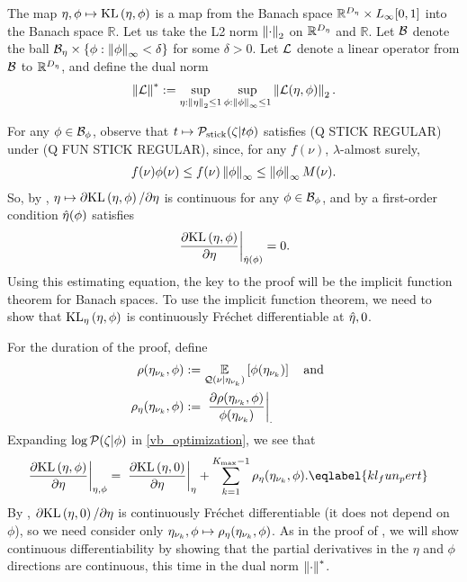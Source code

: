 %
The map $\eta, \phi \mapsto \mathrm{KL}\left(\eta, \phi\right)$ is a map from the Banach space
$\mathbb{R}^{D_{\eta}} \times {L_{\infty}[0,1]}$ into the Banach space $\mathbb{R}$. Let us
take the L2 norm $\left\Vert\cdot\right\Vert_2$ on $\mathbb{R}^{{D_{\eta}}}$ and $\mathbb{R}$.
Let $\mathcal{B}$ denote the ball $\mathcal{B}_\eta \times \{ \phi: \left\Vert\phi\right\Vert_{\infty} <
\delta\}$ for some $\delta > 0$.  Let $\mathcal{L}$ denote a linear operator from
$\mathcal{B}$ to $\mathbb{R}^{D_{\eta}}$, and define the dual norm
%
\begin{align*}
%
\norm{\linop}^* :=
    \sup_{\eta: \norm{\eta}_2 \le 1} \sup_{\phi: \norminf{\phi} \le 1}
     \norm{\linop(\eta, \phi)}_2.
%
\end{align*}

For any $\phi \in \mathcal{B}_\phi$, observe that $t \mapsto \mathcal{P}_{\mathrm{stick}}(\zeta \vert t
\phi)$ satisfies (Q STICK REGULAR) under (Q FUN STICK REGULAR),
since, for any $f(\nu)$, $\lambda$-almost surely,
%
\begin{align*}
%
f(\nu) \phi(\nu) \le f(\nu) \norminf{\phi} \le \norminf{\phi} M(\nu).
%
\end{align*}
%
So, by , $\eta \mapsto \partial \mathrm{KL}\left(\eta, \phi\right) /
\partial \eta$ is continuous for any $\phi \in \mathcal{B}_\phi$, and by a first-order
condition $\hat\eta(\phi)$ satisfies
%
\begin{align*}
%
\fracat{\partial \KL{\eta, \phi}}
                {\partial \eta}
                {\etaopt(\phi)} = 0.
%
\end{align*}
%
Using this estimating equation, the key to the proof will be the implicit
function theorem for Banach spaces. To use the implicit function theorem, we
need to show that $\mathrm{KL}_{\eta}\left(\eta, \phi\right)$ is continuously Fr{\'e}chet
differentiable at $\hat\eta, 0$.


For the duration of the proof, define
%
\begin{align*}
%
\rho(\etanuk, \phi) :={}&
    \expect{\q(\nu \vert \etanuk)}{\phi(\etanuk)}
\mathand\\
\rho_\eta(\etanuk, \phi) :={}&
    \fracat{\partial \rho(\etanuk, \phi)}{\phi(\etanuk)}.
%
\end{align*}
%
Expanding $\log \mathcal{P}(\zeta \vert \phi)$ in \eqref{vb_optimization}, we see that
%
\begin{align}
\fracat{\partial \KL{\eta, \phi}}{\partial \eta}{\eta, \phi}
 ={}&
    \fracat{\partial \KL{\eta, \phiz}}{\partial \eta}{\eta} +
    \sumkm \rho_\eta(\etanuk, \phi). \eqlabel{kl_fun_pert}
%
\end{align}
%
By , $\partial \mathrm{KL}\left(\eta, 0\right) / \partial \eta$ is
continuously Fr{\'e}chet differentiable (it does not depend on $\phi$), so we
need consider only $\eta_{\nu_{k}}, \phi \mapsto \rho_\eta(\eta_{\nu_{k}}, \phi)$.  As
in the proof of , we will show continuous differentiability
by showing that the partial derivatives in the $\eta$ and $\phi$ directions
are continuous, this time in the dual norm $\left\Vert\cdot\right\Vert^*$.

